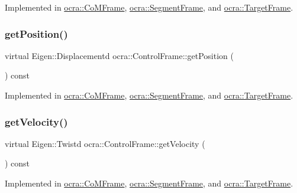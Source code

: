 Implemented in \hyperlink{classocra_1_1CoMFrame_afc280df9814e7eb2cf62f017f7bbfc2e}{ocra\+::\+Co\+M\+Frame}, \hyperlink{classocra_1_1SegmentFrame_a3a14b77753ad98507db9968b33c582e4}{ocra\+::\+Segment\+Frame}, and \hyperlink{classocra_1_1TargetFrame_acfd238567f0cfb9e6107cd17103ec6ea}{ocra\+::\+Target\+Frame}.

\hypertarget{classocra_1_1ControlFrame_aaadbbfbcdd5b8e197a0f181ffb2fdcbe}{}\label{classocra_1_1ControlFrame_aaadbbfbcdd5b8e197a0f181ffb2fdcbe} 
\subsubsection{\texorpdfstring{get\+Position()}{getPosition()}}
{\footnotesize\ttfamily virtual Eigen\+::\+Displacementd ocra\+::\+Control\+Frame\+::get\+Position (\begin{DoxyParamCaption}{ }\end{DoxyParamCaption}) const\hspace{0.3cm}{\ttfamily [pure virtual]}}



Implemented in \hyperlink{classocra_1_1CoMFrame_a809c05664b2e2abb489e930e27fbe2d4}{ocra\+::\+Co\+M\+Frame}, \hyperlink{classocra_1_1SegmentFrame_ad0c5aa3b15b384cd5a4774ddd534b32e}{ocra\+::\+Segment\+Frame}, and \hyperlink{classocra_1_1TargetFrame_ab2f3bd3f05be243a5d9e2123b943986d}{ocra\+::\+Target\+Frame}.

\hypertarget{classocra_1_1ControlFrame_a398df839f75886867c86a8e70ac9bf24}{}\label{classocra_1_1ControlFrame_a398df839f75886867c86a8e70ac9bf24} 
\subsubsection{\texorpdfstring{get\+Velocity()}{getVelocity()}}
{\footnotesize\ttfamily virtual Eigen\+::\+Twistd ocra\+::\+Control\+Frame\+::get\+Velocity (\begin{DoxyParamCaption}{ }\end{DoxyParamCaption}) const\hspace{0.3cm}{\ttfamily [pure virtual]}}



Implemented in \hyperlink{classocra_1_1CoMFrame_a02be3e73c64903d67b1e7ada25c468c5}{ocra\+::\+Co\+M\+Frame}, \hyperlink{classocra_1_1SegmentFrame_a6a45d4901408704ead9bbd1f5b99a666}{ocra\+::\+Segment\+Frame}, and \hyperlink{classocra_1_1TargetFrame_a5eeda88210d7002c3c73ba949139ed5b}{ocra\+::\+Target\+Frame}.

